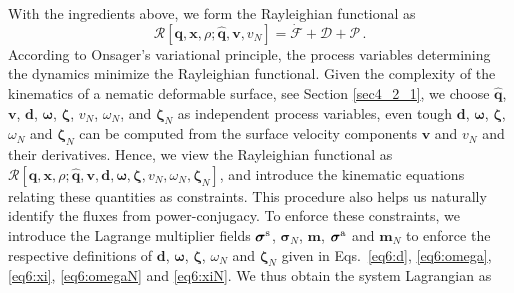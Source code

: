 With the ingredients above, we form the Rayleighian functional as
\begin{equation}  \label{62_II}
	\mathcal{R}\left[\bm{q}, \bm{x},\rho;  \widehat{\bm{q}}, \bm{v},v_N \right] = \dot{\mathcal{F}} + \mathcal{D} + \mathcal{P} \, .
\end{equation}
According to Onsager's variational principle, the process variables determining the dynamics minimize the Rayleighian  functional. Given the complexity of the kinematics of a nematic deformable surface, see Section \ref{sec4_2_1}, we choose  $\widehat{\bm{q}}$, $\bm{v}$, $\bm{d}$, $\bm{\omega}$, $\bm{\zeta}$, $v_N$, $\omega_N$, and $\bm{\zeta}_{N}$ as independent process variables, even tough $\bm{d}$, $\bm{\omega}$, $\bm{\zeta}$, $\omega_N$ and $\bm{\zeta}_{N}$ can be computed from the surface velocity components $\bm{v}$ and $v_N$ and their derivatives. Hence, we view the Rayleighian functional as $\mathcal{R}[ \bm{q}, \bm{x}, \rho;  \widehat{\bm{q}}, \bm{v}, \bm{d}, \bm{\omega}, \bm{\zeta}, v_N, \omega_N, \bm{\zeta}_{N}]$,  and introduce the kinematic equations relating these quantities as constraints. This procedure also helps us naturally identify the fluxes from power-conjugacy. To enforce these constraints, we introduce the Lagrange multiplier fields 
$\bm{\sigma}^{\textup{s}}$, $\bm{\sigma}_N$, $\bm{m}$, $\bm{\sigma}^{\textup{a}}$ and  $\bm{m}_N$ 
to enforce the respective definitions of 
$\bm{d}$, $\bm{\omega}$, $\bm{\zeta}$, $\omega_N$ and $\bm{\zeta}_{N}$ given in Eqs.~\eqref{eq6:d}, \eqref{eq6:omega}, \eqref{eq6:xi}, \eqref{eq6:omegaN} and \eqref{eq6:xiN}. We thus obtain the system Lagrangian as 

